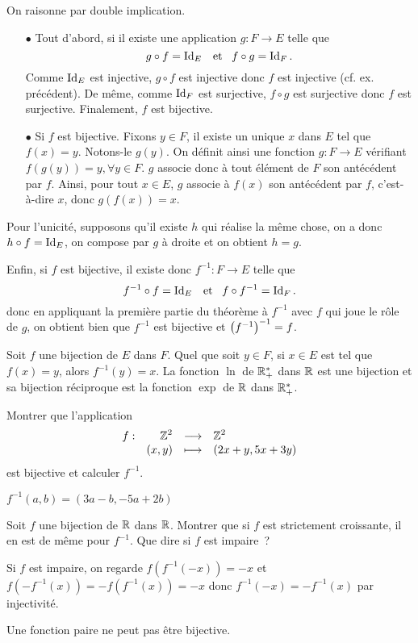 \documentclass{magnoliaold}
\begin{document}
\begin{preuve}
On raisonne par double implication. 
\begin{itemize}
\item [$\bullet$]
Tout d'abord, si il existe une application $g:F\to E$ telle que \[g\circ f=\operatorname{Id}_E \quad\!\text{et}\quad\! f\circ g=\operatorname{Id}_F.\]
Comme $\operatorname{Id}_E$ est injective, $g\circ f$ est injective donc $f$ est injective (cf. ex. précédent). De même, comme $\operatorname{Id}_F$ est surjective, $f\circ g $ est surjective donc $f$ est surjective.
Finalement, $f$ est bijective.
\item [$\bullet$] Si $f$ est bijective. Fixons $y\in F$, il existe un unique $x$ dans $E$ tel que $f(x)=y$. Notons-le $g(y)$. On définit ainsi une fonction $g:F\to E$ vérifiant $f(g(y))=y, \forall y \in F$. $g$ associe donc à tout élément de $F$ son antécédent par $f$. Ainsi, pour tout $x\in E$, $g$ associe à $f(x)$ son antécédent par $f$, c'est-à-dire $x$, donc $g(f(x))=x$.
\end{itemize}
Pour l'unicité, supposons qu'il existe $h$ qui réalise la même chose, on a donc $h\circ f=\operatorname{Id}_E$, on compose par $g$ à droite et on obtient $h=g$.

Enfin, si $f$ est bijective, il existe donc $f^{-1} : F\to E$ telle que \[f^{-1}\circ f=\operatorname{Id}_E \quad\!\text{et}\quad\! f\circ f^{-1}=\operatorname{Id}_F.\] donc en appliquant la première partie du théorème à $f^{-1}$ avec $f$ qui joue le rôle de $g$, on obtient bien que $f^{-1}$ est bijective et $\left(f^{-1}\right)^{-1}=f$.

\end{preuve}

\begin{remarques}
\remarque Soit $f$ une bijection de $E$ dans $F$. Quel que soit $y\in F$, si $x\in E$
  est tel que $f(x)=y$, alors $f^{-1}(y)=x$.
\remarque La fonction $\ln$ de $\mathbb{R}_+^*$ dans $\mathbb{R}$ est une bijection et sa
  bijection réciproque est la fonction $\exp$ de $\mathbb{R}$ dans $\mathbb{R}_+^*$.
\end{remarques}

\begin{exos}
\exo Montrer que l'application
  \[\begin{array}[t]{lrcl} \displaystyle{f} : & \displaystyle{\mathbb{Z}^2} & \longrightarrow & \displaystyle{\mathbb{Z}^2} \\ & \displaystyle{(x,y)} & \longmapsto & \displaystyle{(2x+y,5x+3y)} \end{array}\]
  est bijective et calculer $f^{-1}$.
	\begin{sol}
$f^{-1}(a, b)=(3a-b,-5a+2b)$
	\end{sol}
\exo Soit $f$ une bijection de $\mathbb{R}$ dans $\mathbb{R}$. Montrer que si $f$ est
  strictement croissante, il en est de même pour $f^{-1}$. Que dire si $f$
  est impaire~?
  \begin{sol}
  Si $f$ est impaire, on regarde $f(f^{-1}(-x))=-x$ et $f(-f^{-1}(x))=-f(f^{-1}(x))=-x$ donc $f^{-1}(-x)=-f^{-1}(x)$ par injectivité.
  
  Une fonction paire ne peut pas être bijective.
  \end{sol}
\end{exos}
\end{document}
